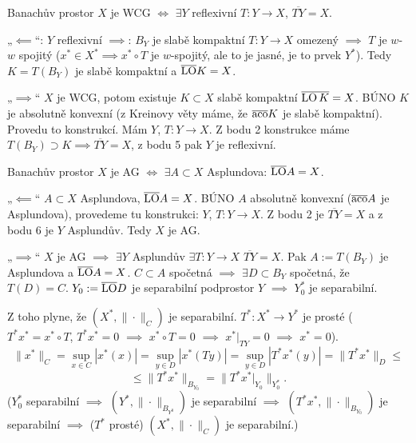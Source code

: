\documentclass[12pt]{article}					%
\begin{document}

\begin{dusledek}
	Banachův prostor $X$ je WCG $\Leftrightarrow$ $\exists Y$ reflexivní $T: Y \rightarrow X$, $\overline{TY} = X$.

	\begin{dukazin}
		„$\impliedby$“: $Y$ reflexivní $\implies$: $B_Y$ je slabě kompaktní $T: Y \rightarrow X$ omezený $\implies$ $T$ je $w$-$w$ spojitý ($x^* \in X^* \implies x^* ∘ T$ je $w$-spojitý, ale to je jasné, je to prvek $Y^*$). Tedy $K = T(B_Y)$ je slabě kompaktní a $\overline{\operatorname{LO}} K = X$.

		„$\implies$“ $X$ je WCG, potom existuje $K \subset X$ slabě kompaktní $\overline{\operatorname{LO} K} = X$. BÚNO $K$ je absolutně konvexní (z Kreinovy věty máme, že $\overline{\operatorname{aco}} K$ je slabě kompaktní). Provedu to konstrukcí. Mám $Y$, $T: Y \rightarrow X$. Z bodu 2 konstrukce máme $T(B_Y) \supset K \implies \overline{TY} = X$, z bodu 5 pak $Y$ je reflexivní.
	\end{dukazin}
\end{dusledek}

\begin{dusledek}
	Banachův prostor $X$ je AG $\Leftrightarrow$ $\exists A \subset X$ Asplundova: $\overline{\operatorname{LO}} A = X$.

	\begin{dukazin}
		„$\impliedby$“ $A \subset X$ Asplundova, $\overline{\operatorname{LO}} A = X$. BÚNO $A$ absolutně konvexní ($\overline{\operatorname{aco}} A$ je Asplundova), provedeme tu konstrukci: $Y$, $T: Y \rightarrow X$. Z bodu 2 je $\overline{TY} = X$ a z bodu 6 je $Y$ Asplundův. Tedy $X$ je AG.

		„$\implies$“ $X$ je AG $\implies$ $\exists Y$ Asplundův $\exists T: Y \rightarrow X$ $\overline{TY} = X$. Pak $A := T(B_Y)$ je Asplundova a $\overline{\operatorname{LO}} A = X$. $C \subset A$ spočetná $\implies$ $\exists D \subset B_Y$ spočetná, že $T(D) = C$. $Y_0 := \overline{\operatorname{LO}} D$ je separabilní podprostor $Y$ $\implies$ $Y_0^*$ je separabilní.

		Z toho plyne, že $(X^*, \|·\|_C)$ je separabilní. $T^*: X^* \rightarrow Y^*$ je prosté ($T^*x^* = x^*∘T$, $T^*x^* = 0$ $\implies$ $x^*∘T = 0$ $\implies$ $x^*|_{TY} = 0$ $\implies$ $x^* = 0$).
		$$ \|x^*\|_C = \sup_{x \in C} |x^*(x)| = \sup_{y \in D} |x^*(Ty)| = \sup_{y \in D} |T^*x^*(y)| = \|T^*x^*\|_D ≤ $$
		$$ ≤ \|T^* x^*\|_{B_{Y_0}} = \|T^*x^* |_{Y_0}\|_{Y_0^*}. $$
		($Y_0^*$ separabilní $\implies$ $(Y^*, \|·\|_{B_{Y^0}})$ je separabilní $\implies$ $(T^*x^*, \|·\|_{B_{Y_0}})$ je separabilní $\implies$ ($T^*$ prosté) $(X^*, \|·\|_C)$ je separabilní.)
	\end{dukazin}
\end{dusledek}
\end{document}
